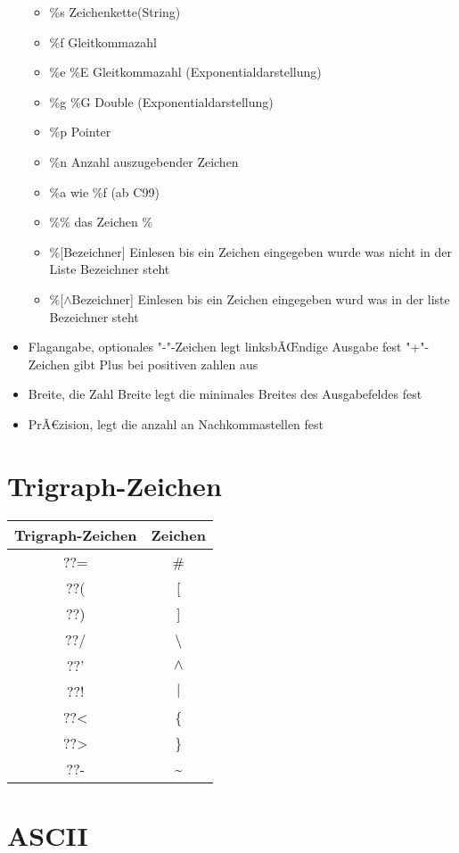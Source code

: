 \documentclass[10pt,a5paper]{report}
\begin{document}
\begin{itemize}
\begin{itemize}
\item \%s Zeichenkette(String)
\item \%f Gleitkommazahl
\item \%e \%E Gleitkommazahl (Exponentialdarstellung)
\item \%g \%G Double (Exponentialdarstellung)
\item \%p Pointer
\item \%n Anzahl auszugebender Zeichen
\item \%a wie \%f (ab C99)
\item \%\% das Zeichen \%
\item \%[Bezeichner] Einlesen bis ein Zeichen eingegeben wurde was nicht in der Liste Bezeichner steht
\item \%[\ensuremath{\land}Bezeichner] Einlesen bis ein Zeichen eingegeben wurd was in der liste Bezeichner steht
\end{itemize}
\item Flagangabe, optionales "-"-Zeichen legt linksbÃŒndige Ausgabe fest "+"-Zeichen gibt Plus bei positiven zahlen aus
\item Breite, die Zahl Breite legt die minimales Breites des Ausgabefeldes fest
\item PrÃ€zision, legt die anzahl an Nachkommastellen fest
\end{itemize}
\newpage
\section{Trigraph-Zeichen}
\begin{tabular}{|c|c|}
\hline Trigraph-Zeichen & Zeichen \\ 
\hline ??= & \# \\ 
\hline ??( & [ \\ 
\hline ??) & ] \\ 
\hline ??/ & \textbackslash \\ 
\hline ??' & \ensuremath{\land} \\ 
\hline ??! & \ensuremath{\vert} \\ 
\hline ??< & \{ \\ 
\hline ??> & \} \\ 
\hline ??- & \textasciitilde \\ 
\hline 
\end{tabular} 
\newpage

\section{ASCII}
\end{document}
